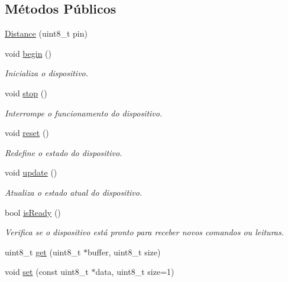 \subsection*{Métodos Públicos}
\begin{DoxyCompactItemize}
\item 
\hyperlink{classDistance_a2c4329362399da0e97f431f97757cf1d}{Distance} (uint8\-\_\-t pin)
\item 
void \hyperlink{classDistance_a682c993094f314fe7870813c2693c36b}{begin} ()
\begin{DoxyCompactList}\small\item\em Inicializa o dispositivo. \end{DoxyCompactList}\item 
void \hyperlink{classDistance_a5154b05bb07f63421d61597f9408ea6c}{stop} ()
\begin{DoxyCompactList}\small\item\em Interrompe o funcionamento do dispositivo. \end{DoxyCompactList}\item 
void \hyperlink{classDistance_a53661de88754833d8d2d26f7f0b4c158}{reset} ()
\begin{DoxyCompactList}\small\item\em Redefine o estado do dispositivo. \end{DoxyCompactList}\item 
void \hyperlink{classDistance_a1bc009e64442db5e875af76ae29ae57f}{update} ()
\begin{DoxyCompactList}\small\item\em Atualiza o estado atual do dispositivo. \end{DoxyCompactList}\item 
bool \hyperlink{classDistance_a16950b1595399b686fdac3c807c7ea47}{is\-Ready} ()
\begin{DoxyCompactList}\small\item\em Verifica se o dispositivo está pronto para receber novos comandos ou leituras. \end{DoxyCompactList}\item 
uint8\-\_\-t \hyperlink{classDistance_a2735c7f7546b7fb0eba7f20940636dcc}{get} (uint8\-\_\-t $\ast$buffer, uint8\-\_\-t size)
\item 
void \hyperlink{classDistance_abcc40ce3c92dc203c282c1d9c15ee0ee}{set} (const uint8\-\_\-t $\ast$data, uint8\-\_\-t size=1)
\end{DoxyCompactItemize}


